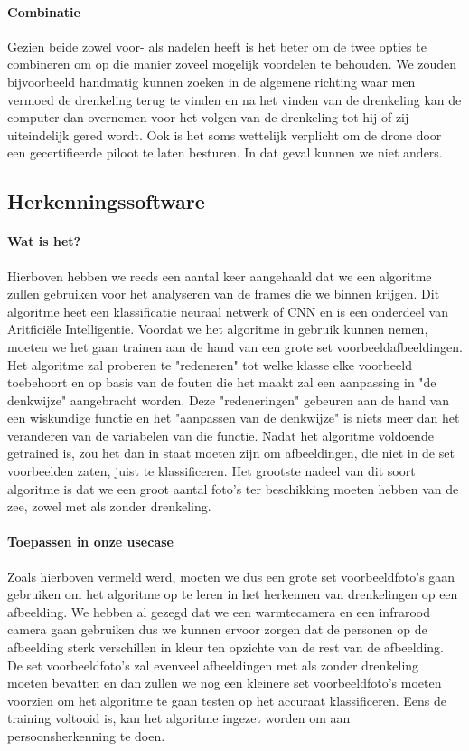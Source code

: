 \paragraph{Combinatie}

Gezien beide zowel voor- als nadelen heeft is het beter om de twee opties te combineren om op die manier zoveel mogelijk voordelen te behouden. We zouden bijvoorbeeld handmatig kunnen zoeken in de algemene richting waar men vermoed de drenkeling terug te vinden en na het vinden van de drenkeling kan de computer dan overnemen voor het volgen van de drenkeling tot hij of zij uiteindelijk gered wordt. Ook is het soms wettelijk verplicht om de drone door een gecertifieerde piloot te laten besturen. In dat geval kunnen we niet anders.

\subsection{Herkenningssoftware}

\paragraph{Wat is het?}

Hierboven hebben we reeds een aantal keer aangehaald dat we een algoritme zullen gebruiken voor het analyseren van de frames die we binnen krijgen. Dit algoritme heet een klassificatie neuraal netwerk of CNN en is een onderdeel van Aritficiële Intelligentie. Voordat we het algoritme in gebruik kunnen nemen, moeten we het gaan trainen aan de hand van een grote set voorbeeldafbeeldingen. Het algoritme zal proberen te "redeneren" tot welke klasse elke voorbeeld toebehoort en op basis van de fouten die het maakt zal een aanpassing in "de denkwijze" aangebracht worden. Deze "redeneringen" gebeuren aan de hand van een wiskundige functie en het "aanpassen van de denkwijze" is niets meer dan het veranderen van de variabelen van die functie. Nadat het algoritme voldoende getrained is, zou het dan in staat moeten zijn om afbeeldingen, die niet in de set voorbeelden zaten, juist te klassificeren. Het grootste nadeel van dit soort algoritme is dat we een groot aantal foto's ter beschikking moeten hebben van de zee, zowel met als zonder drenkeling.

\paragraph{Toepassen in onze usecase}

Zoals hierboven vermeld werd, moeten we dus een grote set voorbeeldfoto's gaan gebruiken om het algoritme op te leren in het herkennen van drenkelingen op een afbeelding. We hebben al gezegd dat we een warmtecamera en een infrarood camera gaan gebruiken dus we kunnen ervoor zorgen dat de personen op de afbeelding sterk verschillen in kleur ten opzichte van de rest van de afbeelding. De set voorbeeldfoto's zal evenveel afbeeldingen met als zonder drenkeling moeten bevatten en dan zullen we nog een kleinere set voorbeeldfoto's moeten voorzien om het algoritme te gaan testen op het accuraat klassificeren. Eens de training voltooid is, kan het algoritme ingezet worden om aan persoonsherkenning te doen.

